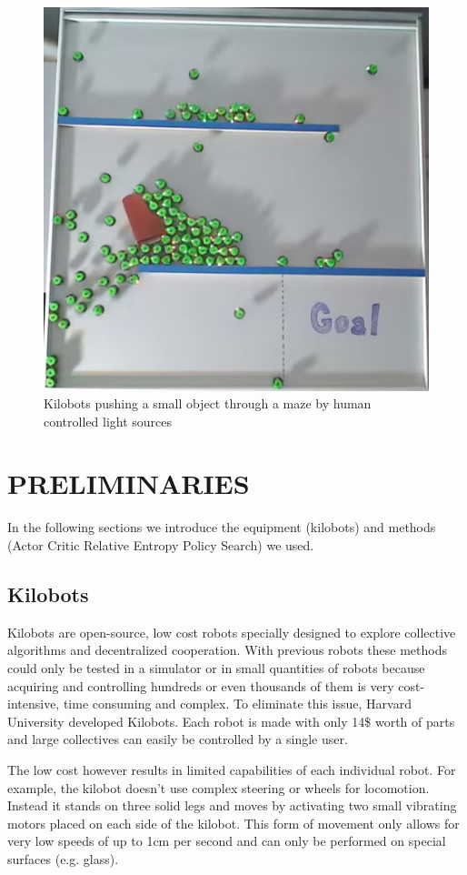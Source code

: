 \documentclass[twoside]{article}
\begin{document}
\begin{figure}[!htb]
    \centering
    \includegraphics[width=0.8\linewidth]{figures/inspiration.png}
    \caption{Kilobots pushing a small object through a maze by human controlled
    light sources\cite{kilobotMaze}}
\end{figure}

\section{PRELIMINARIES}
In the following sections we introduce the equipment
(kilobots\cite{kilobot}) and methods (Actor Critic Relative Entropy Policy
Search)\cite{acreps} we used.

\subsection{Kilobots}
Kilobots\cite{kilobot} are open-source, low cost robots specially designed to
explore collective algorithms and decentralized cooperation. With previous
robots these methods could only be tested in a simulator or in small quantities
of robots because acquiring and controlling hundreds or even thousands of them
is very cost-intensive, time consuming and complex. To eliminate this issue,
Harvard University developed Kilobots. Each robot is made with only 14\$ worth
of parts and large collectives can easily be controlled by a single user.

The low cost however results in limited capabilities of each individual robot.
For example, the kilobot doesn't use complex steering or wheels for locomotion.
Instead it stands on three solid legs and moves by activating two small
vibrating motors placed on each side of the kilobot. This form of movement only
allows for very low speeds of up to 1cm per second and can only be
performed on special surfaces (e.g. glass).
\end{document}

